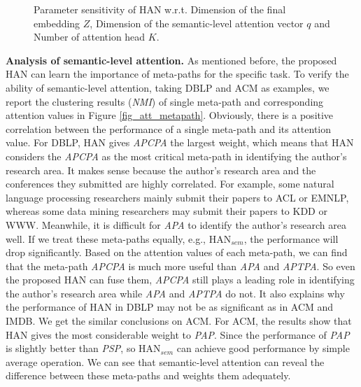 \begin{figure*}
	\centering
	\caption{Parameter sensitivity of HAN w.r.t. Dimension of the final embedding $Z$,  Dimension of the semantic-level attention vector $q$ and Number of attention head $K$.}
	\label{fig_para2}
\end{figure*}


\textbf{Analysis of semantic-level attention.} 
As mentioned before, the proposed HAN can learn the importance of meta-paths for the specific task.
To verify the ability of semantic-level attention, taking DBLP and ACM as examples, we report the clustering results (\emph{NMI}) of single meta-path and corresponding attention values in Figure \ref{fig_att_metapath}. Obviously, there is a positive correlation between the performance of a single meta-path and its attention value. 
For DBLP, HAN gives \emph{APCPA} the largest weight, which means that HAN considers the \emph{APCPA} as the most critical meta-path in identifying the author's research area. It makes sense because the author's research area and the conferences they submitted are highly correlated. For example, some natural language processing researchers mainly submit their papers to ACL or EMNLP, whereas some data mining researchers may submit their papers to KDD or WWW.
Meanwhile, it is difficult for \emph{APA} to identify the author's research area well. If we treat these meta-paths equally, e.g., HAN$_{sem}$, the performance will drop significantly. 
Based on the attention values of each meta-path, we can find that the meta-path \emph{APCPA} is much more useful than \emph{APA} and \emph{APTPA}. So even the proposed HAN can fuse them, \emph{APCPA} still plays a leading role in identifying the author's research area  while \emph{APA} and \emph{APTPA} do not.
It also explains why the performance of HAN in DBLP may not be as significant as in ACM and IMDB.
We get the similar conclusions on ACM.
For ACM, the results show that HAN gives the most considerable weight to \emph{PAP}. Since the performance of \emph{PAP} is slightly better than \emph{PSP}, so HAN$_{sem}$ can achieve good performance by simple average operation. We can see that semantic-level attention can reveal the difference between these meta-paths and weights them adequately.


